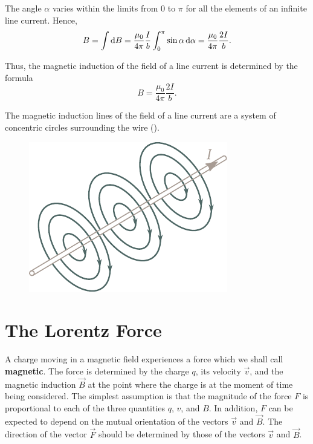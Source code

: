 The angle $\alpha$ varies within the limits from $0$ to $\pi$ for all the elements of an infinite line current. Hence,
\begin{equation*}
    B = \int \mathrm{d} B = \frac{\mu_0}{4\pi} \frac{I}{b} \int_0^{\pi} \sin\alpha\, \mathrm{d}\alpha = \frac{\mu_0}{4\pi} \frac{2I}{b}.
\end{equation*}

\noindent
Thus, the magnetic induction of the field of a line current is determined by the formula
\begin{equation}\label{eq:6_30}
    B = \frac{\mu_0}{4\pi} \frac{2I}{b}.
\end{equation}

The magnetic induction lines of the field of a line current are a system of concentric circles surrounding the wire ().

\begin{figure}[t]
	\begin{center}
		\includegraphics[scale=1]{figures/ch_06/fig_6_5.pdf}
		\caption[]{}
		\label{fig:6_5}
	\end{center}
	\vspace{-0.8cm}
\end{figure}

\section{The Lorentz Force}\label{sec:6_5}

A charge moving in a magnetic field experiences a force which we shall call \textbf{magnetic}. The force is determined by the charge $q$, its velocity $\vec{v}$, and the magnetic induction $\vec{B}$ at the point where the charge is at the moment of time being considered. The simplest assumption is that the magnitude of the force $F$ is proportional to each of the three quantities $q$, $v$, and $B$. In addition, $F$ can be expected to depend on the mutual orientation of the vectors $\vec{v}$ and $\vec{B}$. The direction of the vector $\vec{F}$ should be determined by those of the vectors $\vec{v}$ and $\vec{B}$.

